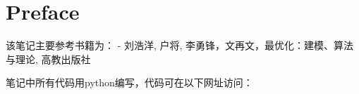 \chapter*{Preface}


该笔记主要参考书籍为：
- 刘浩洋, 户将, 李勇锋，文再文，最优化：建模、算法与理论, 高教出版社

笔记中所有代码用python编写，代码可在以下网址访问：







